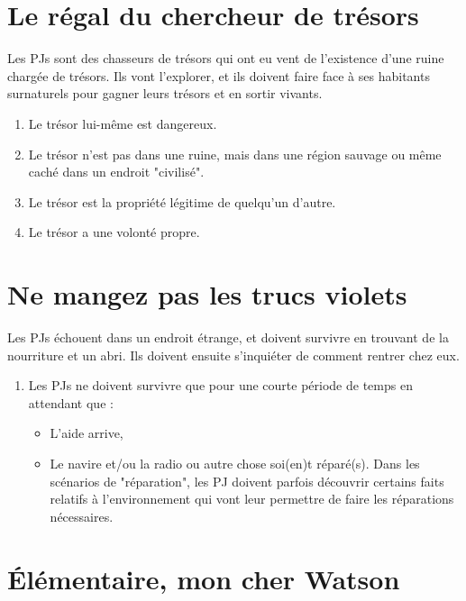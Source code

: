 \begin{multicols}{2}
\section{Le régal du chercheur de trésors}
\label{tresor}


Les PJs sont des chasseurs de trésors qui ont eu vent de l'existence d'une ruine chargée de trésors. Ils vont l'explorer, et ils doivent faire face à ses habitants surnaturels pour gagner leurs trésors et en sortir vivants.

\themes
\begin{enumerate}
\item Le trésor lui-même est dangereux.
\item Le trésor n'est pas dans une ruine, mais dans une région sauvage ou même caché dans un endroit "civilisé".
\item Le trésor est la propriété légitime de quelqu'un d'autre.
\item Le trésor a une volonté propre.
\end{enumerate}

\section{Ne mangez pas les trucs violets}
\label{violet}


Les PJs échouent dans un endroit étrange, et doivent survivre en trouvant de la nourriture et un abri. Ils doivent ensuite s'inquiéter de comment rentrer chez eux.

\themes
\begin{enumerate}
\item Les PJs ne doivent survivre que pour une courte période de temps en attendant que :
\begin{itemize}
\item L'aide arrive,
\item Le navire et/ou la radio ou autre chose soi(en)t réparé(s). Dans les scénarios de "réparation", les PJ doivent parfois découvrir certains faits relatifs à l'environnement qui vont leur permettre de faire les réparations nécessaires.
\end{itemize}
\end{enumerate}

\section{Élémentaire, mon cher Watson}
\label{watson}


\end{multicols}

